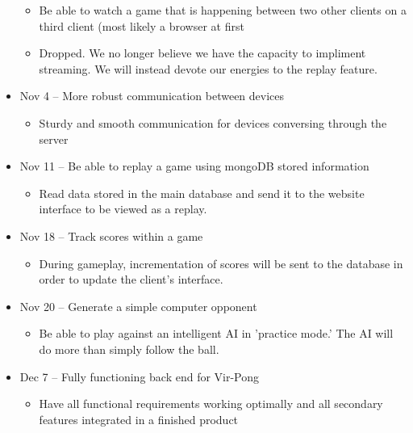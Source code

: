 \documentclass[letterpaper,12pt]{article}
\begin{document}
\begin{itemize}
	\begin{itemize}
		\item Be able to watch a game that is happening between two other clients on a third client (most likely a browser at first
		\item Dropped. We no longer believe we have the capacity to impliment streaming. We will instead devote our energies to the replay feature.
	\end{itemize}
	\item Nov 4 -- More robust communication between devices
	\begin{itemize}
		\item Sturdy and smooth communication for devices conversing through the server
	\end{itemize}
	\item Nov 11 -- Be able to replay a game using mongoDB stored information
	\begin{itemize}
		\item Read data stored in the main database and send it to the website interface to be viewed as a replay.
	\end{itemize}
	\item Nov 18 -- Track scores within a game
	\begin{itemize}
		\item During gameplay, incrementation of scores will be sent to the database in order to update the client's interface.
	\end{itemize}
	\item Nov 20 -- Generate a simple computer opponent
	\begin{itemize}
		\item Be able to play against an intelligent AI in 'practice mode.' The AI will do more than simply follow the ball.		
	\end{itemize}
	\item Dec 7 -- Fully functioning back end for Vir-Pong
	\begin{itemize}
		\item Have all functional requirements working optimally and all secondary features integrated in a finished product		
	\end{itemize}
\end{itemize}
\end{document}
